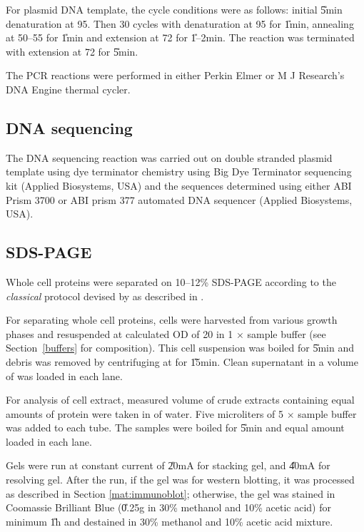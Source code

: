 For plasmid DNA template, the cycle conditions were as follows:
initial \U{5}{min} denaturation at 95\dg. Then 30 cycles with
denaturation at 95\dg{} for \U{1}{min}, annealing at 50--55\dg{}
for \U{1}{min} and extension at 72\dg{} for \U{1--2}{min}. The
reaction was terminated with extension at 72\dg{} for \U{5}{min}.

The PCR reactions were performed in either Perkin Elmer or M J
Research's DNA Engine{\scriptsize{\texttrademark}} thermal cycler.

\subsection{DNA sequencing}

The DNA sequencing reaction was carried out on double stranded
plasmid template using dye terminator chemistry using Big Dye
Terminator sequencing kit (Applied Biosystems, USA) and the
sequences determined using either ABI Prism 3700 or ABI prism 377
automated DNA sequencer (Applied Biosystems, USA).

\subsection{SDS-PAGE}
\label{mat:sds} Whole cell proteins were separated on 10--12\%
SDS-PAGE according to the \emph{classical} protocol devised by
\citet{Laemmli1970} as described in \citet{Sambrook1989}.

For separating whole cell proteins, cells were harvested from
various growth phases and resuspended at calculated OD of 20 in 1
$\times$ sample buffer (see Section~\ref{buffers} for
composition). This cell suspension was boiled for \U{5}{min} and
debris was removed by centrifuging at  for \U{15}{min}.
Clean supernatant in a volume of  was loaded in each
lane.

For analysis of cell extract, measured volume of crude extracts
containing equal amounts of protein were taken in  of
water. Five microliters of 5 $\times$ sample buffer was added to
each tube. The samples were boiled for \U{5}{min} and equal amount
loaded in each lane.

Gels were run at constant current of \U{20}{mA} for stacking gel,
and \U{40}{mA} for resolving gel. After the run, if the gel was
for western blotting, it was processed as described in Section
\ref{mat:immunoblot}; otherwise, the gel was stained in Coomassie
Brilliant Blue (\U{0.25}{g} in 30\% methanol and 10\% acetic acid)
for minimum \U{1}{h} and destained in 30\% methanol and 10\%
acetic acid mixture.

